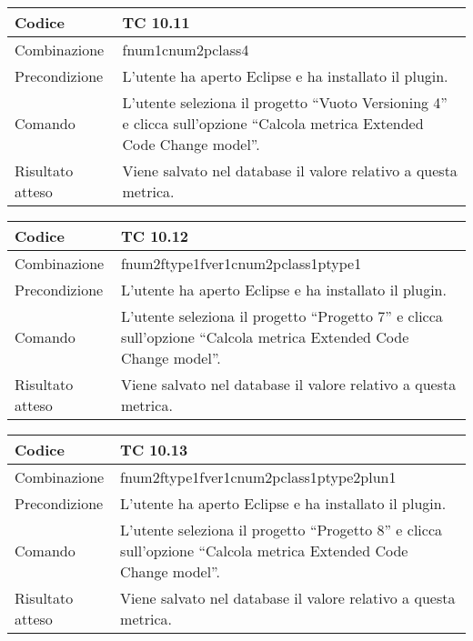 \begin{table}[ht]
\begin{tabular}{|p{3cm}|p{9cm}|}
\hline
\cellcolor{lightgray}Codice				& TC 10.11								\\
\hline
\cellcolor{lightgray}Combinazione		& fnum1cnum2pclass4									\\
\hline
\cellcolor{lightgray}Precondizione		& L'utente ha aperto Eclipse e ha installato il plugin.		\\
\hline
\cellcolor{lightgray}Comando			& L'utente seleziona il progetto ``Vuoto Versioning 4''  e clicca sull'opzione ``Calcola metrica Extended Code Change model''.	\\
\hline
\cellcolor{lightgray}Risultato atteso	& Viene salvato nel database il valore relativo a questa metrica.\\
\hline
\end{tabular}
\end{table}

\begin{table}[ht]
\begin{tabular}{|p{3cm}|p{9cm}|}
\hline
\cellcolor{lightgray}Codice				& TC 10.12								\\
\hline
\cellcolor{lightgray}Combinazione		& fnum2ftype1fver1cnum2pclass1ptype1									\\
\hline
\cellcolor{lightgray}Precondizione		& L'utente ha aperto Eclipse e ha installato il plugin.		\\
\hline
\cellcolor{lightgray}Comando			& L'utente seleziona il progetto ``Progetto 7''  e clicca sull'opzione ``Calcola metrica Extended Code Change model''.	\\
\hline
\cellcolor{lightgray}Risultato atteso	& Viene salvato nel database il valore relativo a questa metrica.\\
\hline
\end{tabular}
\end{table}

\clearpage

\begin{table}[ht]
\begin{tabular}{|p{3cm}|p{9cm}|}
\hline
\cellcolor{lightgray}Codice				& TC 10.13								\\
\hline
\cellcolor{lightgray}Combinazione		& fnum2ftype1fver1cnum2pclass1ptype2plun1									\\
\hline
\cellcolor{lightgray}Precondizione		& L'utente ha aperto Eclipse e ha installato il plugin.		\\
\hline
\cellcolor{lightgray}Comando			& L'utente seleziona il progetto ``Progetto 8''  e clicca sull'opzione ``Calcola metrica Extended Code Change model''.	\\
\hline
\cellcolor{lightgray}Risultato atteso	& Viene salvato nel database il valore relativo a questa metrica.\\
\hline
\end{tabular}
\end{table}

